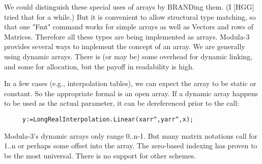 We could distinguish these special uses of arrays by
BRANDing them.  (I [HGG] tried that for a while.)
But it is convenient to allow structural type matching,
so that one "Fmt" command works for simple arrays
as well as Vectors and rows of Matrices.
Therefore all these types are being implemented as arrays.
Modula-3 provides several ways to
implement the concept of an array.
We are generally using dynamic arrays.
There is (or may be) some overhead for
dynamic linking, and some for allocation,
but the payoff in readability is high.

In a few cases (e.g., interpolation tables), we can expect
the array to be static or constant.  So the appropriate
formal is an open array.
If a dynamic array happens to be used as the actual parameter,
it can be dereferenced prior to the call:

\begin{tt} \begin{verbatim}
     y:=LongRealInterpolation.Linear(xarr^,yarr^,x);
\end{verbatim} \end{tt}

Modula-3's dynamic arrays only range 0..n-1.
But many matrix notations call for 1..n or
perhaps some offset into the array.
The zero-based indexing has proven to be the most universal.
There is no support for other schemes.
